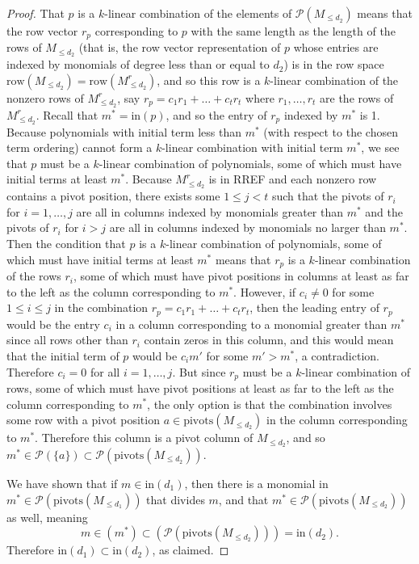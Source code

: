 \documentclass[12pt]{article}
\newcommand{\init}{\text{in}}
\newcommand{\Poly}{\mathscr{P}}
\newcommand{\row}{\text{row}}
\newcommand{\piv}{\text{pivots}}
\begin{document}
\begin{proof}
	That $p$ is a $k$-linear combination of the elements of $\Poly(M_{\leq d_2})$ means that the row vector $r_p$ corresponding to $p$ with the same length as the length of the rows of $M_{\leq d_2}$ (that is, the row vector representation of $p$ whose entries are indexed by monomials of degree less than or equal to $d_2$) is in the row space $\row(M_{\leq d_2}) = \row(M_{\leq d_2}^r)$, and so this row is a $k$-linear combination of the nonzero rows of $M_{\leq d_2}^r$, say $r_p = c_1 r_1 + \dots + c_t r_t$ where $r_1, \dots, r_t$ are the rows of $M_{\leq d_2}^r$. Recall that $m^* = \init(p)$, and so the entry of $r_p$ indexed by $m^*$ is 1. Because polynomials with initial term less than $m^*$ (with respect to the chosen term ordering) cannot form a $k$-linear combination with initial term $m^*$, we see that $p$ must be a $k$-linear combination of polynomials, some of which must have initial terms at least $m^*$. Because $M_{\leq d_2}^r$ is in RREF and each nonzero row contains a pivot position, there exists some $1 \leq j < t$ such that the pivots of $r_i$ for $i = 1, \dots, j$ are all in columns indexed by monomials greater than $m^*$ and the pivots of $r_i$ for $i > j$ are all in columns indexed by monomials no larger than $m^*$. Then the condition that $p$ is a $k$-linear combination of polynomials, some of which must have initial terms at least $m^*$ means that $r_p$ is a $k$-linear combination of the rows $r_i$, some of which must have pivot positions in columns at least as far to the left as the column corresponding to $m^*$. However, if $c_i \neq 0$ for some $1 \leq i \leq j$ in the combination $r_p = c_1 r_1 + \dots + c_t r_t$, then the leading entry of $r_p$ would be the entry $c_i$ in a column corresponding to a monomial greater than $m^*$ since all rows other than $r_i$ contain zeros in this column, and this would mean that the initial term of $p$ would be $c_i m'$ for some $m' > m^*$, a contradiction. Therefore $c_i = 0$ for all $i = 1, \dots, j$. But since $r_p$ must be a $k$-linear combination of rows, some of which must have pivot positions at least as far to the left as the column corresponding to $m^*$, the only option is that the combination involves some row with a pivot position $a \in \piv(M_{\leq d_2})$ in the column corresponding to $m^*$. Therefore this column is a pivot column of $M_{\leq d_2}$, and so $m^* \in \Poly(\{a\}) \subset \Poly(\piv(M_{\leq d_2}))$.

	We have shown that if $m \in \init(d_1)$, then there is a monomial in $m^* \in \Poly(\piv(M_{\leq d_1}))$ that divides $m$, and that $m^* \in \Poly(\piv(M_{\leq d_2}))$ as well, meaning \[ m \in (m^*) \subset (\Poly(\piv(M_{\leq d_2}))) = \init(d_2). \] Therefore $\init(d_1) \subset \init(d_2)$, as claimed. 
\end{proof}
\end{document}
